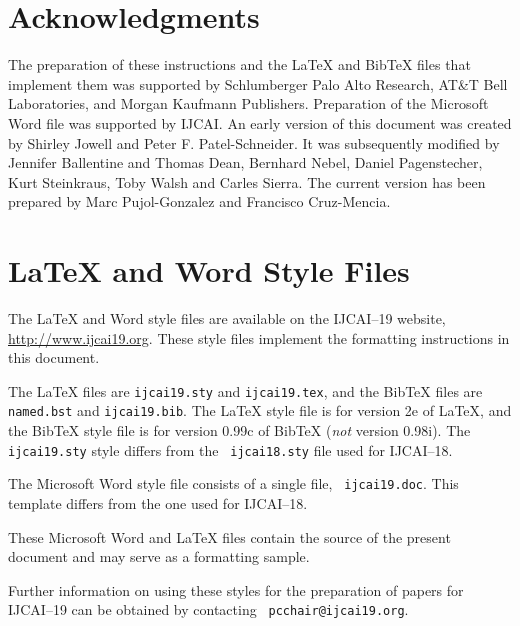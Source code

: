 \documentclass{article}
\begin{document}
\section*{Acknowledgments}

The preparation of these instructions and the \LaTeX{} and Bib\TeX{}
files that implement them was supported by Schlumberger Palo Alto
Research, AT\&T Bell Laboratories, and Morgan Kaufmann Publishers.
Preparation of the Microsoft Word file was supported by IJCAI.  An
early version of this document was created by Shirley Jowell and Peter
F. Patel-Schneider.  It was subsequently modified by Jennifer
Ballentine and Thomas Dean, Bernhard Nebel, Daniel Pagenstecher,
Kurt Steinkraus, Toby Walsh and Carles Sierra. The current version 
has been prepared by Marc Pujol-Gonzalez and Francisco Cruz-Mencia.

\appendix

\section{\LaTeX{} and Word Style Files}\label{stylefiles}

The \LaTeX{} and Word style files are available on the IJCAI--19
website, \url{http://www.ijcai19.org}.
These style files implement the formatting instructions in this
document.

The \LaTeX{} files are {\tt ijcai19.sty} and {\tt ijcai19.tex}, and
the Bib\TeX{} files are {\tt named.bst} and {\tt ijcai19.bib}. The
\LaTeX{} style file is for version 2e of \LaTeX{}, and the Bib\TeX{}
style file is for version 0.99c of Bib\TeX{} ({\em not} version
0.98i). The {\tt ijcai19.sty} style differs from the {\tt
ijcai18.sty} file used for IJCAI--18.

The Microsoft Word style file consists of a single file, {\tt
ijcai19.doc}. This template differs from the one used for
IJCAI--18.

These Microsoft Word and \LaTeX{} files contain the source of the
present document and may serve as a formatting sample.  

Further information on using these styles for the preparation of
papers for IJCAI--19 can be obtained by contacting {\tt
pcchair@ijcai19.org}.



\end{document}
